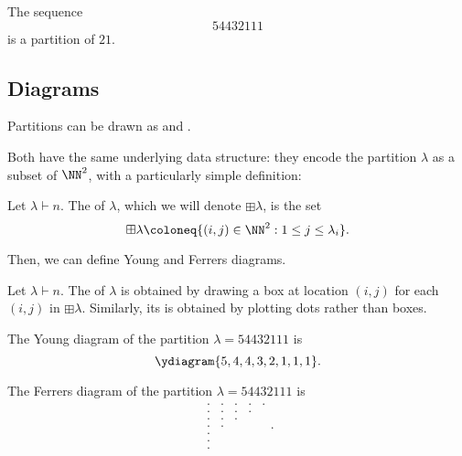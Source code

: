 \documentclass{article}
\begin{document}
\begin{example}
    The sequence
    \[
        54432111
    \]
    is a partition of $21$.
\end{example}


\subsection{Diagrams}
Partitions can be drawn as  and . 

Both have the same underlying data structure: they encode the partition $\lambda$ as a subset of $\NN^2$, with a particularly simple definition:

\begin{definition}
    Let $\lambda \vdash n$. The  of $\lambda$, which we will denote $\boxplus \lambda$, is the set
    \[
        \boxplus \lambda \coloneq \{(i,j) \in \NN^2 : 1 \leq j \leq \lambda_i\}.
    \]
\end{definition}

Then, we can define Young and Ferrers diagrams.

\begin{definition}
    Let $\lambda \vdash n$.
    The  of $\lambda$ is obtained by drawing a box at location $(i,j)$ for each $(i,j)$ in $\boxplus\lambda$.
    Similarly, its  is obtained by plotting dots rather than boxes.
\end{definition}

\newpage

\begin{example}
    The Young diagram of the partition $\lambda = 54432111$ is
    \[
        \ydiagram{5,4,4,3,2,1,1,1}.
    \]
\end{example}
\begin{example}
    The Ferrers diagram of the partition $\lambda = 54432111$ is
    \[
        \begin{matrix}
            . & . & . & . & . \\
            . & . & . & . &  \\
            . & . & . &   &  \\
            . & . &   &   &  \\
            . &   &   &   &  \\
            . &   &   &   &  \\
            . &   &   &   & 
        \end{matrix}.
    \]
\end{example}
\end{document}
